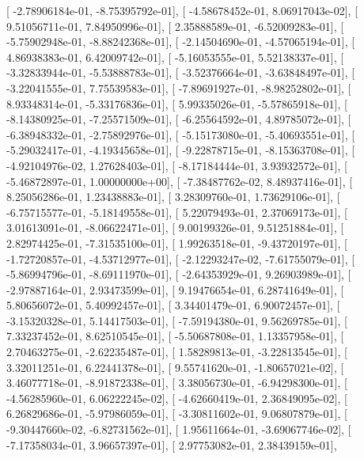 \documentclass{article}
\begin{document}
       [ -2.78906184e-01,  -8.75395792e-01],
       [ -4.58678452e-01,   8.06917043e-02],
       [  9.51056711e-01,   7.84950996e-01],
       [  2.35888589e-01,  -6.52009283e-01],
       [ -5.75902948e-01,  -8.88242368e-01],
       [ -2.14504690e-01,  -4.57065194e-01],
       [  4.86938383e-01,   6.42009742e-01],
       [ -5.16053555e-01,   5.52138337e-01],
       [ -3.32833944e-01,  -5.53888783e-01],
       [ -3.52376664e-01,  -3.63848497e-01],
       [ -3.22041555e-01,   7.75539583e-01],
       [ -7.89691927e-01,  -8.98252802e-01],
       [  8.93348314e-01,  -5.33176836e-01],
       [  5.99335026e-01,  -5.57865918e-01],
       [ -8.14380925e-01,  -7.25571509e-01],
       [ -6.25564592e-01,   4.89785072e-01],
       [ -6.38948332e-01,  -2.75892976e-01],
       [ -5.15173080e-01,  -5.40693551e-01],
       [ -5.29032417e-01,  -4.19345658e-01],
       [ -9.22878715e-01,  -8.15363708e-01],
       [ -4.92104976e-02,   1.27628403e-01],
       [ -8.17184444e-01,   3.93932572e-01],
       [ -5.46872897e-01,   1.00000000e+00],
       [ -7.38487762e-02,   8.48937416e-01],
       [  8.25056286e-01,   1.23438883e-01],
       [  3.28309760e-01,   1.73629106e-01],
       [ -6.75715577e-01,  -5.18149558e-01],
       [  5.22079493e-01,   2.37069173e-01],
       [  3.01613091e-01,  -8.06622471e-01],
       [  9.00199326e-01,   9.51251884e-01],
       [  2.82974425e-01,  -7.31535100e-01],
       [  1.99263518e-01,  -9.43720197e-01],
       [ -1.72720857e-01,  -4.53712977e-01],
       [ -2.12293247e-02,  -7.61755079e-01],
       [ -5.86994796e-01,  -8.69111970e-01],
       [ -2.64353929e-01,   9.26903989e-01],
       [ -2.97887164e-01,   2.93473599e-01],
       [  9.19476654e-01,   6.28741649e-01],
       [  5.80656072e-01,   5.40992457e-01],
       [  3.34401479e-01,   6.90072457e-01],
       [ -3.15320328e-01,   5.14417503e-01],
       [ -7.59194380e-01,   9.56269785e-01],
       [  7.33237452e-01,   8.62510545e-01],
       [ -5.50687808e-01,   1.13357958e-01],
       [  2.70463275e-01,  -2.62235487e-01],
       [  1.58289813e-01,  -3.22813545e-01],
       [  3.32011251e-01,   6.22441378e-01],
       [  9.55741620e-01,  -1.80657021e-02],
       [  3.46077718e-01,  -8.91872338e-01],
       [  3.38056730e-01,  -6.94298300e-01],
       [ -4.56285960e-01,   6.06222245e-02],
       [ -4.62660419e-01,   2.36849095e-02],
       [  6.26829686e-01,  -5.97986059e-01],
       [ -3.30811602e-01,   9.06807879e-01],
       [ -9.30447660e-02,  -6.82731562e-01],
       [  1.95611664e-01,  -3.69067746e-02],
       [ -7.17358034e-01,   3.96657397e-01],
       [  2.97753082e-01,   2.38439159e-01],
\end{document}
